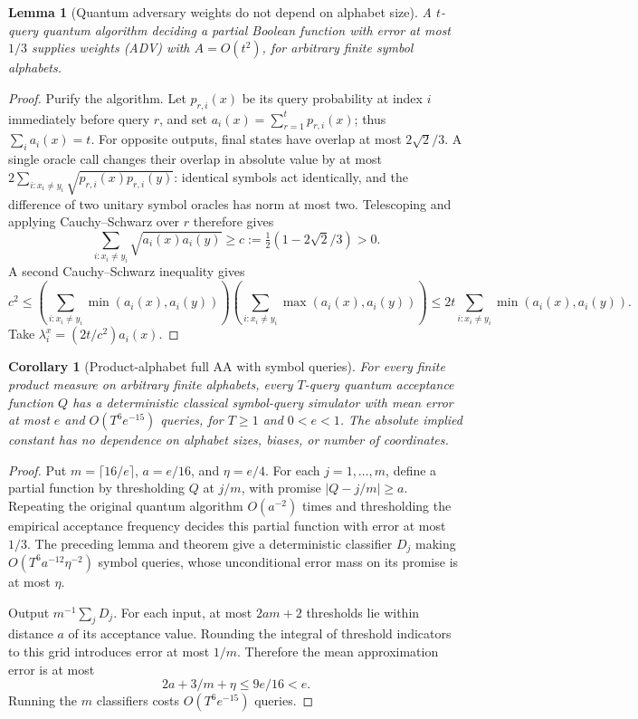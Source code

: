 \documentclass[11pt]{article}
\newtheorem{lemma}[theorem]{Lemma}
\newtheorem{corollary}[theorem]{Corollary}
\theoremstyle{definition}
\theoremstyle{remark}
\begin{document}
\begin{lemma}[Quantum adversary weights do not depend on alphabet size]
\label{lem:resolution-symbol-adversary}
A \(t\)-query quantum algorithm deciding a partial Boolean function
with error at most \(1/3\) supplies weights (ADV) with \(A=O(t^2)\),
for arbitrary finite symbol alphabets.
\end{lemma}

\begin{proof}
Purify the algorithm. Let \(p_{r,i}(x)\) be its query probability
at index \(i\) immediately before query \(r\), and set
\(a_i(x)=\sum_{r=1}^t p_{r,i}(x)\); thus \(\sum_i a_i(x)=t\).
For opposite outputs, final states have overlap at most
\(2\sqrt2/3\). A single oracle call changes their overlap in
absolute value by at most
\(2\sum_{i:x_i\ne y_i}\sqrt{p_{r,i}(x)p_{r,i}(y)}\): identical
symbols act identically, and the difference of two unitary symbol
oracles has norm at most two. Telescoping and applying Cauchy--Schwarz
over \(r\) therefore gives
\[
 \sum_{i:x_i\ne y_i}\sqrt{a_i(x)a_i(y)}\ge
 c:=\tfrac12(1-2\sqrt2/3)>0.
\]
A second Cauchy--Schwarz inequality gives
\[
 c^2\le
 \left(\sum_{i:x_i\ne y_i}\min(a_i(x),a_i(y))\right)
 \left(\sum_{i:x_i\ne y_i}\max(a_i(x),a_i(y))\right)
 \le2t\sum_{i:x_i\ne y_i}\min(a_i(x),a_i(y)).
\]
Take \(\lambda_i^x=(2t/c^2)a_i(x)\).
\end{proof}

\begin{corollary}[Product-alphabet full AA with symbol queries]
\label{cor:resolution-product-alphabet-aa}
For every finite product measure on arbitrary finite alphabets,
every \(T\)-query quantum acceptance function \(Q\) has a
deterministic classical symbol-query simulator with mean error at
most \(e\) and \(O(T^6e^{-15})\) queries, for
\(T\ge1\) and \(0<e<1\). The absolute implied constant has no
dependence on alphabet sizes, biases, or number of coordinates.
\end{corollary}

\begin{proof}
Put \(m=\lceil16/e\rceil\), \(a=e/16\), and \(\eta=e/4\).
For each \(j=1,\ldots,m\), define a partial function by thresholding
\(Q\) at \(j/m\), with promise \(|Q-j/m|\ge a\).
Repeating the original quantum algorithm \(O(a^{-2})\) times and
thresholding the empirical acceptance frequency decides this partial
function with error at most \(1/3\). The preceding lemma and theorem
give a deterministic classifier \(D_j\) making
\(O(T^6a^{-12}\eta^{-2})\) symbol queries, whose unconditional
error mass on its promise is at most \(\eta\).

Output \(m^{-1}\sum_jD_j\). For each input, at most \(2am+2\)
thresholds lie within distance \(a\) of its acceptance value.
Rounding the integral of threshold indicators to this grid introduces
error at most \(1/m\). Therefore the mean approximation error is
at most
\[
 2a+3/m+\eta\le9e/16<e.
\]
Running the \(m\) classifiers costs \(O(T^6e^{-15})\) queries.
\end{proof}
\end{document}
